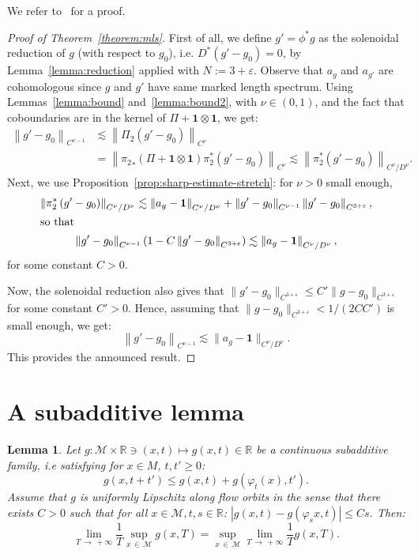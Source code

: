 \documentclass[10pt]{amsart}
\newtheorem{lemm}[theo]{Lemma}\newtheorem{prop}[theo]{Proposition}\newtheorem{coro}[theo]{Corollary}\newtheorem{conj}[theo]{Conjecture}
\theoremstyle{definition}\newtheorem{defi}[theo]{Definition}\newtheorem{rema}[theo]{Remark}\newtheorem{exam}[theo]{Example}\newtheorem{exem}[theo]{Example}\newtheorem{nota}[theo]{Notation}
\newcommand{\R}{\mathbb{R}}
\newcommand{\bfun}{\mathbf{1}}
\newcommand{\eps}{\varepsilon}
\newcommand{\M}{\mathcal{M}}
\begin{document}
We refer to~\cite{Ebin-68, Guillarmou-Lefeuvre-18} for a proof.

\begin{proof}[Proof of Theorem~\ref{theorem:mls}]
First of all, we define $g' = \phi^*g$ as the solenoidal reduction of $g$ (with respect to $g_0$), i.e. $D^*(g'-g_0) = 0$, by Lemma~\ref{lemma:reduction} applied with $N := 3+\eps$. Observe that $a_g$ and $a_{g'}$ are cohomologous since $g$ and $g'$ have same marked length spectrum. Using Lemmas~\ref{lemma:bound} and~\ref{lemma:bound2}, with $\nu\in (0,1)$, and the fact that coboundaries are in the kernel of $\Pi + \bfun\otimes\bfun$, we get:
\begin{align*}
\left\|g'-g_0\right\|_{C^{\nu-1}} &\lesssim \left\|\Pi_2(g'-g_0)\right\|_{C^{\nu}}\\
&= \left\|{\pi_2}_* (\Pi + \bfun\otimes\bfun)\pi_2^\ast \left(g'-g_0\right)\right\|_{C^\nu} \lesssim \left\| \pi_2^\ast\left(g'-g_0\right) \right\|_{C^\nu/D^\nu}.
\end{align*}
Next, we use Proposition~\ref{prop:sharp-estimate-stretch}: for $\nu>0$ small enough,
\begin{gather*}
\left\| \pi_2^\ast\left(g'-g_0\right)\right\|_{C^\nu/D^\nu} \lesssim \left\| a_g- \bfun\right\|_{C^\nu/D^\nu} + \left\|g'-g_0\right\|_{C^{\nu-1}}\left\|g'-g_0\right\|_{C^{3+\eps}},
\\
\intertext{so that}
\left\|g'-g_0\right\|_{C^{\nu-1}} \left(1- C \left\|g'-g_0\right\|_{C^{3+\eps}}\right) \lesssim \left\| a_g- \bfun\right\|_{C^\nu/D^\nu},
\end{gather*}
for some constant $C > 0$.

Now, the solenoidal reduction also gives that $\|g'-g_0\|_{C^{3+\eps}} \leq C' \|g-g_0\|_{C^{3+\eps}}$ for some constant $C' > 0$. Hence, assuming that $\|g-g_0\|_{C^{3+ \eps}} < 1/(2CC')$ is small enough, we get:
\[
\left\|g'-g_0\right\|_{C^{\nu-1}} \lesssim \|a_g - \bfun\|_{C^\nu/D^{\nu}}.
\]
This provides the announced result.
\end{proof}



\appendix



\section{A subadditive lemma}


\begin{lemm}\label{lemma:sub}
Let $g: \M \times \R \ni (x,t) \mapsto g(x,t) \in \R$ be a continuous subadditive family, i.e satisfying for $x\in M$, $t,t'\geq 0$:
\[
g(x, t+ t') \leq g(x,t)+g(\varphi_t(x), t').
\]
Assume that $g$ is uniformly Lipschitz along flow orbits in the sense that there exists $C >0$ such that for all $x \in \M, t,s \in \R$: $|g(x,t)-g(\varphi_s x,t)| \leq Cs$. Then:
\[
\lim_{T\,\rightarrow\,+\infty} \frac{1}{T} \sup_{x\,\in\,\M} g(x,T) = \sup_{x\,\in\,\M} \lim_{T\,\rightarrow\,+\infty} \frac{1}{T} g(x,T).
\]
\end{lemm}
\end{document}
